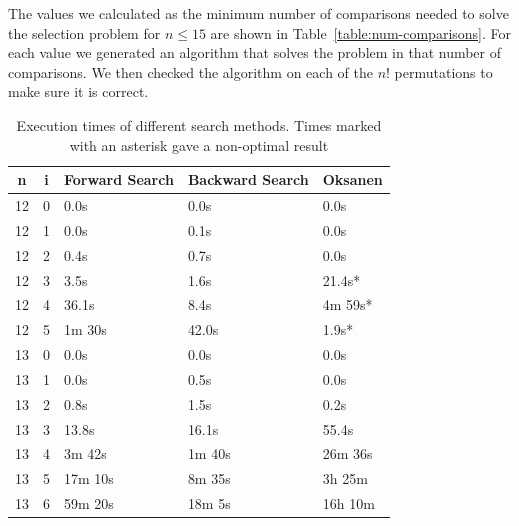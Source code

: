 \documentclass[10pt,journal,compsoc]{IEEEtran}
\begin{document}
The values we calculated as the minimum number of comparisons needed to solve the selection problem for $n \leq 15$ are shown in Table~\ref{table:num-comparisons}.
For each value we generated an algorithm that solves the problem in that number of comparisons.
We then checked the algorithm on each of the $n!$ permutations to make sure it is correct.

\begin{table}[!t]
  \renewcommand{\arraystretch}{1.2}
  \caption{Execution times of different search methods. Times marked with an asterisk gave a non-optimal result}
  \label{table:search_algorithms}
  \centering
  \begin{tabular}{c|c|l|l|l}
    \textbf{n} & \textbf{i} & \textbf{Forward Search} & \textbf{Backward Search} & \textbf{Oksanen} \\
    \hline
    12         & 0          & 0.0s                    & 0.0s                     & 0.0s             \\
    12         & 1          & 0.0s                    & 0.1s                     & 0.0s             \\
    12         & 2          & 0.4s                    & 0.7s                     & 0.0s             \\
    12         & 3          & 3.5s                    & 1.6s                     & 21.4s*           \\
    12         & 4          & 36.1s                   & 8.4s                     & 4m 59s*          \\
    12         & 5          & 1m 30s                  & 42.0s                    & 1.9s*            \\
    \hline
    13         & 0          & 0.0s                    & 0.0s                     & 0.0s             \\
    13         & 1          & 0.0s                    & 0.5s                     & 0.0s             \\
    13         & 2          & 0.8s                    & 1.5s                     & 0.2s             \\
    13         & 3          & 13.8s                   & 16.1s                    & 55.4s            \\
    13         & 4          & 3m 42s                  & 1m 40s                   & 26m 36s          \\
    13         & 5          & 17m 10s                 & 8m 35s                   & 3h 25m           \\
    13         & 6          & 59m 20s                 & 18m 5s                   & 16h 10m          \\

\end{tabular}
\end{table}
\end{document}
